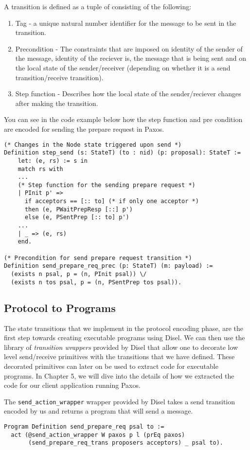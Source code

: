 A transition is defined as a tuple of consisting of the following:
\begin{enumerate}
  \item Tag - a unique natural number identifier for the message to be sent in the transition.
  \item Precondition - The constraints that are imposed on identity of the sender of the message,
    identity of the reciever is, the message that is being sent and on the local state of
    the sender/receiver (depending on whether it is a send transition/receive transition).
  \item Step function - Describes how the local state of the sender/reciever changes after
    making the transition.
\end{enumerate}

You can see in the code example below how the step function and pre condition
are encoded for sending the prepare request in Paxos.

\begin{lstlisting}
(* Changes in the Node state triggered upon send *)
Definition step_send (s: StateT) (to : nid) (p: proposal): StateT :=
    let: (e, rs) := s in
    match rs with
    ...
    (* Step function for the sending prepare request *)
    | PInit p' =>
      if acceptors == [:: to] (* if only one acceptor *)
      then (e, PWaitPrepResp [::] p')
      else (e, PSentPrep [:: to] p')
    ...
    | _ => (e, rs)
    end.

(* Precondition for send prepare request transition *)
Definition send_prepare_req_prec (p: StateT) (m: payload) :=
  (exists n psal, p = (n, PInit psal)) \/
  (exists n tos psal, p = (n, PSentPrep tos psal)).
\end{lstlisting}

\subsection{Protocol to Programs}
The state transitions that we implement in the protocol encoding phase, are the
first step towards creating executable programs using Disel.
We can then use the library of \textit{transition wrappers} provided by Disel
that allow one to decorate low level send/receive primitives with the transitions
that we have defined. These decorated primitives can later on be used to extract
code for executable programs. In Chapter 5, we will dive into the details of
how we extracted the code for our client application running Paxos.

The \texttt{send\_action\_wrapper} wrapper provided by Disel takes a send transition encoded
by us and returns a program that will send a message.
\begin{lstlisting}
Program Definition send_prepare_req psal to :=
  act (@send_action_wrapper W paxos p l (prEq paxos)
       (send_prepare_req_trans proposers acceptors) _ psal to).
\end{lstlisting}


